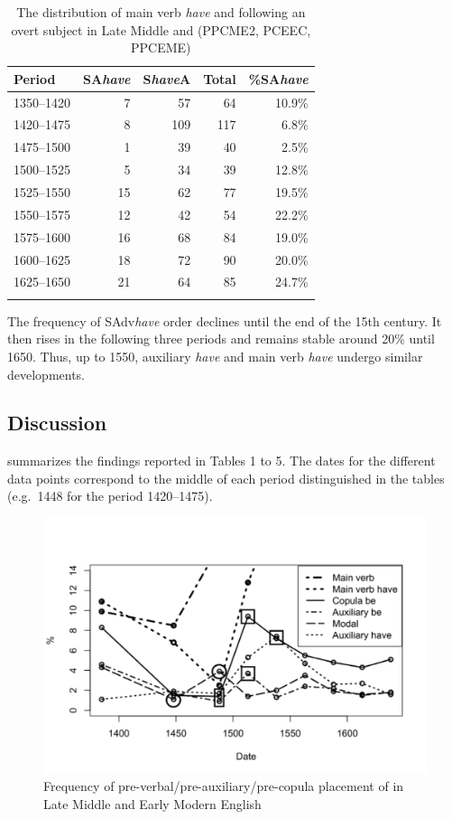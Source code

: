 \documentclass[output=paper]{langsci/langscibook}
\begin{document}
\begin{table}
\caption{The distribution of main verb \emph{have} and  following an
overt subject in Late Middle and  (PPCME2, PCEEC, PPCEME)\label{tab:key:09.5}}
\begin{tabular}{lrrrr}
\lsptoprule
{Period} & {SA\emph{have}} & {S\emph{have}A} & {Total} & {\%SA\emph{have}}\\
\midrule
1350--1420 & 7 & 57 & 64 & 10.9\%\\
1420--1475 & 8 & 109 & 117 & 6.8\%\\
1475--1500 & 1 & 39 & 40 & 2.5\%\\
1500--1525 & 5 & 34 & 39 & 12.8\%\\
1525--1550 & 15 & 62 & 77 & 19.5\%\\
1550--1575 & 12 & 42 & 54 & 22.2\%\\
1575--1600 & 16 & 68 & 84 & 19.0\%\\
1600--1625 & 18 & 72 & 90 & 20.0\%\\
1625--1650 & 21 & 64 & 85 & 24.7\%\\
\lspbottomrule
\end{tabular}
\end{table}

The frequency of SAdv\emph{have} order declines until the end of the 15th
century. It then rises in the following three periods and remains stable around
20\% until 1650. Thus, up to 1550, auxiliary \emph{have} and main verb
\emph{have} undergo similar developments.

\subsection{Discussion}

 summarizes the findings reported in Tables 1 to 5. The dates
for the different data points correspond to the middle of each period
distinguished in the tables (e.g.\ 1448 for the period 1420--1475).

\begin{figure}
\caption{Frequency of pre-verbal/pre-auxiliary/pre-copula placement
of  in Late Middle and Early Modern English\label{fig:key:09.1}}
    \includegraphics[width=\textwidth]{./img/09-fig1-2.pdf}
\end{figure}
\end{document}
